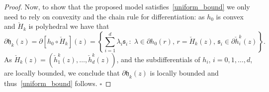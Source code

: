 \documentclass[smallextended,envcountsect]{svjour3}
\newcommand{\col}[1]{\left\{#1\right\}}
\newcommand{\modelh}{\mathfrak{h}}
\newcommand{\mybox}{{\hfill $\square$}}
\begin{document}
\begin{proof}
Now, to show that the proposed model satisfies~\eqref{uniform_bound} we only need to rely on convexity and the chain rule for differentiation:
as $h_0$ is convex and $\check{H}_k$ is polyhedral we have that
\begin{equation}\label{chain-rule}
\partial \modelh_k(z) = \partial  [h_0\circ \check{H}_{k}](z)= \col{\sum_{i=1}^d \lambda_i\mathfrak{s}_i\,:\; \lambda \in \partial h_0(r),\, r=\check{H}_{k}(z),\, \mathfrak{s}_i \in \partial \check{h}_i^k(z)}.
\end{equation}
As $\check{H}_k(z)=(\check{h}_1^k(z),\ldots, \check{h}_d^k(z))$,   %
and the subdifferentials of $h_i$, $i=0,1,\ldots,d$, are locally bounded, we conclude that $\partial \modelh_k(z)$ is locally bounded and thus~\eqref{uniform_bound} follows. 
\mybox
\end{proof}
\end{document}
